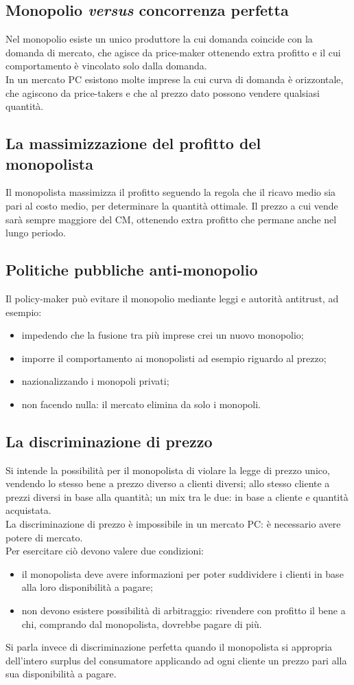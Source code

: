 \documentclass{report}
\begin{document}
	\subsection{Monopolio \textit{versus} concorrenza perfetta}
	Nel monopolio esiste un unico produttore la cui domanda coincide con la domanda di mercato, che agisce da price-maker ottenendo extra profitto e il cui comportamento è vincolato solo dalla domanda.
	\medskip \\In un mercato PC esistono molte imprese la cui curva di domanda è orizzontale, che agiscono da price-takers e che al prezzo dato possono vendere qualsiasi quantità.
	\subsection{La massimizzazione del profitto del monopolista}
	Il monopolista massimizza il profitto seguendo la regola che il ricavo medio sia pari al costo medio, per determinare la quantità ottimale. Il prezzo a cui vende sarà sempre maggiore del CM, ottenendo extra profitto che permane anche nel lungo periodo.
	\subsection{Politiche pubbliche anti-monopolio}
	Il policy-maker può evitare il monopolio mediante leggi e autorità antitrust, ad esempio:
	\begin{itemize}
		\item impedendo che la fusione tra più imprese crei un nuovo monopolio; \item imporre il comportamento ai monopolisti ad esempio riguardo al prezzo; \item nazionalizzando i monopoli privati; \item non facendo nulla: il mercato elimina da solo i monopoli.
	\end{itemize}
	\subsection{La discriminazione di prezzo}
	Si intende la possibilità per il monopolista di violare la legge di prezzo unico, vendendo lo stesso bene a prezzo diverso a clienti diversi; allo stesso cliente a prezzi diversi in base alla quantità; un mix tra le due: in base a cliente e quantità acquistata.
	\medskip \\
	La discriminazione di prezzo è impossibile in un mercato PC: è necessario avere potere di mercato.
	\medskip \\
	Per esercitare ciò devono valere due condizioni:
	\begin{itemize}
		\item il monopolista deve avere informazioni per poter suddividere i clienti in base alla loro disponibilità a pagare;
		\item non devono esistere possibilità di arbitraggio: rivendere con profitto il bene a chi, comprando dal monopolista, dovrebbe pagare di più.
	\end{itemize}
	Si parla invece di discriminazione perfetta quando il monopolista si appropria dell'intero surplus del consumatore applicando ad ogni cliente un prezzo pari alla sua disponibilità a pagare.
\end{document}
